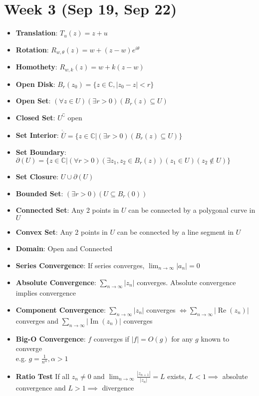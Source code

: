 \documentclass[12pt]{article}
\newcommand{\C}{\mathbb{C}}
\DeclareMathOperator{\real}{Re}
\DeclareMathOperator{\imgn}{Im}
\begin{document}
\section*{Week 3 (Sep 19, Sep 22)}
\begin{itemize}
    \item \textbf{Translation}: $T_u(z)=z+u$
    \item \textbf{Rotation}: $R_{w,\theta}(z)=w+(z-w)e^{i\theta}$
    \item \textbf{Homothety}: $R_{w,k}(z)=w+k(z-w)$
    \item \textbf{Open Disk}: $B_r(z_0)=\{z\in\C, |z_0-z|<r\}$
    \item \textbf{Open Set}: $(\forall z\in U)(\exists r>0)(B_r(z)\subseteq U)$
    \item \textbf{Closed Set}: $U^\complement$ open
    \item \textbf{Set Interior}: $\mathring{\overline{U}}=\{z\in \C|(\exists r>0)(B_r(z)\subseteq U)\}$
    \item \textbf{Set Boundary}: $\partial(U)=\{z\in\C|(\forall r>0)(\exists z_1,z_2\in B_r(z))(z_1\in U)(z_2\notin U)\}$
    \item \textbf{Set Closure}: $U\cup\partial(U)$
    \item \textbf{Bounded Set}: $(\exists r>0)(U\subseteq B_r(0))$
    \item \textbf{Connected Set}: Any 2 points in $U$ can be connected by a polygonal curve in $U$
    \item \textbf{Convex Set}: Any 2 points in $U$ can be connected by a line segment in $U$
    \item \textbf{Domain}: Open and Connected
    \item \textbf{Series Convergence}: If series converges, $\lim_{n\rightarrow\infty}|a_n|=0$
    \item \textbf{Absolute Convergence}: $\sum_{n\rightarrow\infty}|z_n|$ converges. Absolute convergence implies convergence
    \item \textbf{Component Convergence}: $\sum_{n\rightarrow\infty}|z_n|$ converges $\iff \sum_{n\rightarrow\infty}|\real(z_n)|$ converges and $\sum_{n\rightarrow\infty}|\imgn(z_n)|$ converges
    \item \textbf{Big-O Convergence}: $f$ converges if $|f|=O(g)$ for any $g$ known to converge \\
    e.g. $g=\frac{1}{n^\alpha},\alpha>1$
    \item \textbf{Ratio Test} If all $z_n\neq0$ and $\lim_{n\rightarrow\infty}\frac{|z_{n+1}|}{|z_n|}=L$ exists, $L<1\implies$ absolute convergence and $L>1\implies$ divergence

\end{itemize}
\end{document}
